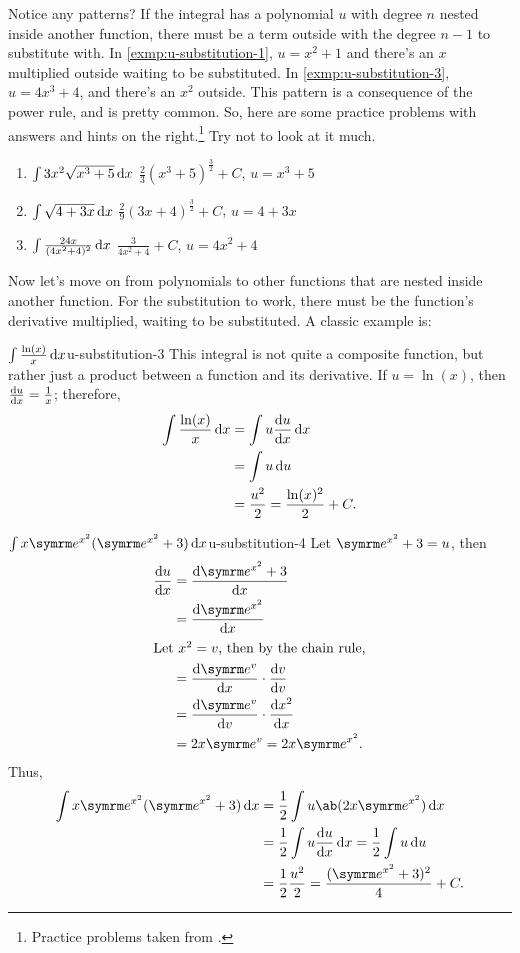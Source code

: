 Notice any patterns? If the integral has a polynomial $u$ with degree $n$ nested inside another function, there must be a term outside with the degree $n - 1$ to substitute with. In \cref{exmp:u-substitution-1}, $u = x^2 + 1$ and there's an $x$ multiplied outside waiting to be substituted. In \cref{exmp:u-substitution-3}, $u = 4x^3 + 4$, and there's an $x^2$ outside. This pattern is a consequence of the power rule, and is pretty common. So, here are some practice problems with answers and hints on the right.\footnote{Practice problems taken from \cite{foster-no-date}.} Try not to look at it much.

\begin{enumerate}
	\item $\int 3x^2\sqrt{x^3 + 5}\odif{x}$ \hfill $\frac{2}{3}(x^3 + 5)^{\frac{3}{2}} + C$, $u = x^3 + 5$
	\item $\int \sqrt{4 + 3x}\odif{x}$ \hfill $\frac{2}{9}(3x + 4)^{\frac{3}{2}} + C$, $u = 4 + 3x$
	\item $\int \frac{24x}{(4x^2 + 4)^2}\odif{x}$ \hfill $\frac{3}{4x^2 + 4} + C$, $u = 4x^2 + 4$
\end{enumerate}

Now let's move on from polynomials to other functions that are nested inside another function. For the substitution to work, there must be the function's derivative multiplied, waiting to be substituted. A classic example is:
\begin{exmp}{$\int \frac{\ln(x)}{x}\odif{x}$}{u-substitution-3}
	This integral is not quite a composite function, but rather just a product between a function and its derivative. If $u = \ln(x)$, then $\odv{u}{x} = \frac{1}{x}$; therefore,
	\begin{align}
		\int \frac{\ln(x)}{x}\odif{x} &= \int u\odv{u}{x}\odif{x} \\
									  &= \int u\odif{u} \\
									  &= \frac{u^2}{2} = \frac{\ln(x)^2}{2} + C.
	\end{align}
\end{exmp}

\begin{exmp}{$\int x\e^{x^2}(\e^{x^2} + 3)\odif{x}$}{u-substitution-4}
	Let $\e^{x^2} + 3 = u$, then
	\begin{align}
		\odv{u}{x} &= \odv{\e^{x^2} + 3}{x} \\
				   &= \odv{\e^{x^2}}{x} \\
				   \intertext{Let $x^2 = v$, then by the chain rule,}
				   &= \odv{\e^v}{x} \cdot \odv{v}{v} \\
				   &= \odv{\e^v}{v} \cdot \odv{x^2}{x} \\
				   &= 2x\e^v = 2x\e^{x^2}.
	\end{align}
	Thus,
	\begin{align}
		\int x\e^{x^2}(\e^{x^2} + 3)\odif{x} &= \frac{1}{2}\int u\ab(2x\e^{x^2})\odif{x} \\
											 &= \frac{1}{2}\int u\odv{u}{x}\odif{x} = \frac{1}{2}\int u\odif{u} \\
											 &= \frac{1}{2}\frac{u^2}{2} = \frac{(\e^{x^2} + 3)^2}{4} + C.
	\end{align}
\end{exmp}

